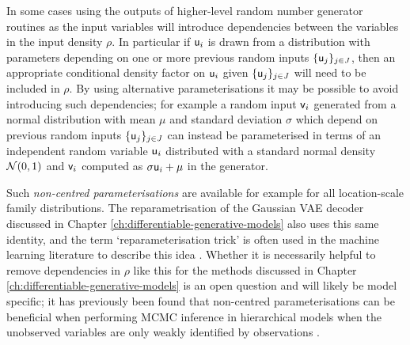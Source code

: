 In some cases using the outputs of higher-level random number generator routines as the input variables will introduce dependencies between the variables in the input density $\rho$. In particular if $\mathsf{u}_i$ is drawn from a distribution with parameters depending on one or more previous random inputs $\lbrace \mathsf{u}_j\rbrace_{j\in\mathit{J}}$, then an appropriate conditional density factor on $\mathsf{u}_i$ given $\lbrace \mathsf{u}_j\rbrace_{j\in\mathit{J}}$ will need to be included in $\rho$. By using alternative parameterisations it may be possible to avoid introducing such dependencies; for example a random input $\mathsf{v}_i$ generated from a normal distribution with mean $\mu$ and standard deviation $\sigma$ which depend on previous random inputs $\lbrace \mathsf{u}_j\rbrace_{j\in\mathit{J}}$ can instead be parameterised in terms of an independent random variable $\mathsf{u}_i$ distributed with a standard normal density $\nrm{0,1}$ and $\mathsf{v}_i$ computed as $\sigma \mathsf{u}_i + \mu$ in the generator. 

Such \emph{non-centred parameterisations} \citep{price1958useful,bonnet1964transformations,papaspiliopoulos2007general} are available for example for all location-scale family distributions. The reparametrisation of the Gaussian \ac{VAE} decoder discussed in Chapter \ref{ch:differentiable-generative-models} also uses this same identity, and the term `reparameterisation trick' is often used in the machine learning literature to describe this idea \citep{kingma2013auto}. Whether it is necessarily helpful to remove dependencies in $\rho$ like this for the methods discussed in Chapter \ref{ch:differentiable-generative-models} is an open question and will likely be model specific; it has previously been found that non-centred parameterisations can be beneficial when performing \ac{MCMC} inference in hierarchical models when the unobserved variables are only weakly identified by observations \citep{papaspiliopoulos2003non,papaspiliopoulos2007general,betancourt2015hamiltonian}.  %



